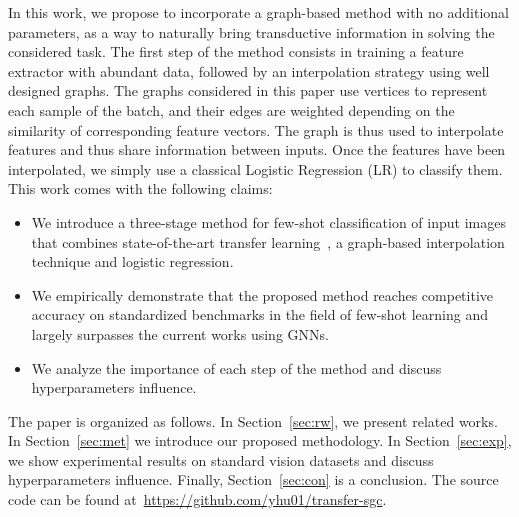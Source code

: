 \documentclass[a4paper,conference]{IEEEtran}
\begin{document}
In this work, we propose to incorporate a graph-based method with no additional parameters, as a way to naturally bring transductive information in solving the considered task. The first step of the method consists in training a feature extractor with abundant data, followed by an interpolation strategy using well designed graphs. The graphs considered in this paper use vertices to represent each sample of the batch, and their edges are weighted depending on the similarity of corresponding feature vectors. The graph is thus used to interpolate features and thus share information between inputs. Once the features have been interpolated, we simply use a classical Logistic Regression (LR) to classify them. This work comes with the following claims:
\begin{itemize}
    \item We introduce a three-stage method for few-shot classification of input images that combines state-of-the-art transfer learning~\cite{mangla2020charting}, a graph-based interpolation technique and logistic regression.
    \item We empirically demonstrate that the proposed method reaches competitive accuracy on standardized benchmarks in the field of few-shot learning and largely surpasses the current works using GNNs.
    \item We analyze the importance of each step of the method and discuss hyperparameters influence.
\end{itemize}

The paper is organized as follows. In Section~\ref{sec:rw}, we present related works. In Section~\ref{sec:met} we introduce our proposed methodology. In Section~\ref{sec:exp}, we show experimental results on standard vision datasets and discuss hyperparameters influence. Finally, Section~\ref{sec:con} is a conclusion.
The source code can be found at~\url{https://github.com/yhu01/transfer-sgc}.
\end{document}
